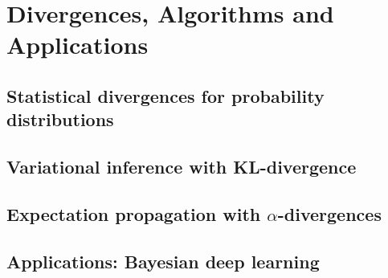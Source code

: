 
\chapter{Divergences, Algorithms and Applications}
\label{chap:background}

\ifpdf
    \graphicspath{{Chapter2/Figs/Raster/}{Chapter2/Figs/PDF/}{Chapter2/Figs/}}
\else
    \graphicspath{{Chapter2/Figs/Vector/}{Chapter2/Figs/}}
\fi



\section{Statistical divergences for probability distributions}



\section{Variational inference with KL-divergence}
\label{sec:energy}




\section{Expectation propagation with $\alpha$-divergences}






\section{Applications: Bayesian deep learning}



